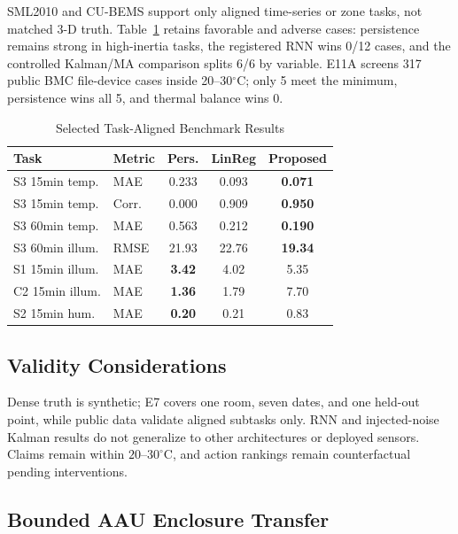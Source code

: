 \documentclass[conference,a4paper]{IEEEtran}
\begin{document}
SML2010 \cite{romeu2014sml2010} and CU-BEMS \cite{chitalia2020cubems} support only aligned time-series or zone tasks, not matched 3-D truth. Table~\ref{tab:benchmark} retains favorable and adverse cases: persistence remains strong in high-inertia tasks, the registered RNN wins 0/12 cases, and the controlled Kalman/MA comparison splits 6/6 by variable. E11A screens 317 public BMC file-device cases inside 20--30$^\circ$C; only 5 meet the minimum, persistence wins all 5, and thermal balance wins 0.

\begin{table}[t]
\caption{Selected Task-Aligned Benchmark Results}
\label{tab:benchmark}
\centering
\scriptsize
\begin{tabular}{|l|l|c|c|c|}
\hline
Task & Metric & Pers. & LinReg & Proposed\\
\hline
S3 15min temp. & MAE  & 0.233 & 0.093 & \textbf{0.071}\\
S3 15min temp. & Corr. & 0.000 & 0.909 & \textbf{0.950}\\
S3 60min temp. & MAE  & 0.563 & 0.212 & \textbf{0.190}\\
S3 60min illum. & RMSE & 21.93 & 22.76 & \textbf{19.34}\\
S1 15min illum. & MAE  & \textbf{3.42} & 4.02 & 5.35\\
C2 15min illum. & MAE  & \textbf{1.36} & 1.79 & 7.70\\
S2 15min hum. & MAE  & \textbf{0.20} & 0.21 & 0.83\\
\hline
\end{tabular}
\end{table}

\subsection{Validity Considerations}
Dense truth is synthetic; E7 covers one room, seven dates, and one held-out point, while public data validate aligned subtasks only. RNN and injected-noise Kalman results do not generalize to other architectures or deployed sensors. Claims remain within $20$--$30^\circ$C, and action rankings remain counterfactual pending interventions.

\subsection{Bounded AAU Enclosure Transfer}
\end{document}
